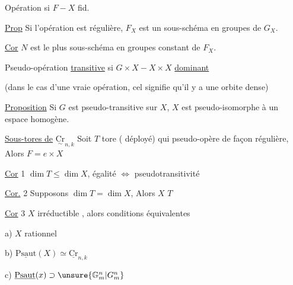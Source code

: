 
Opération  si $F\mathbin{-} X$ fid. 

\uline{Prop} Si l'opération est régulière, $F_X$ est un sous-schéma en groupes de $G_X$.

\uline{Cor} $N$ est le plus  sous-schéma en groupes constant de $F_X$.

Pseudo-opération \uline{transitive} si $G\times X\mathbin{-}X\times X$ \uline{dominant}

(dans le cas d'une vraie opération, cel signifie qu'il y a une  orbite dense)

\uline{Proposition} Si $G$ est pseudo-transitive sur $X$, $X$ est pseudo-isomorphe à un espace homogène.

\uline{Sous-tores de} $\underset{\sim}{\mathrm{Cr}}_{n,k}$  Soit $T$ tore ( déployé) qui pseudo-opère de façon    régulière,  Alors $F=e\times X$


\uline{Cor} 1 $\dim T\leq\dim X$, égalité $\Longleftrightarrow$ pseudotransitivité

\uline{Cor.} 2 Supposons $\dim T=\dim X$,  Alors $X$ \deleted{$\unsure{\simeq|\approx}$} $T$

\uline{Cor} 3 $X$ irréductible , alors conditions équivalentes

a) $X$ rationnel

b) $\underline{\mathrm{Psaut}}(X)\simeq\underline{\mathrm{Cr}}_{n,k}$

c) $\underline{\mathrm{Psaut}}(x)\supset\unsure{\mathbb G_m^n|G_m^n}$

